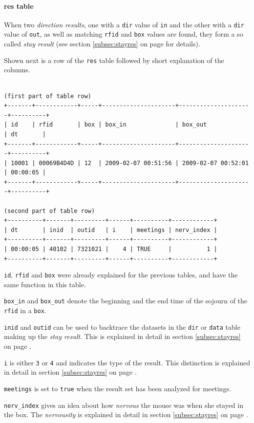 \paragraph{res table}
\label{para:res_table}

When two \textit{direction results}, one with a \lstinline|dir| value of \lstinline|in| and the other with a \lstinline|dir| value of \lstinline|out|, as well as matching \lstinline|rfid| and \lstinline|box| values are found, they form a so called \textit{stay result} (see section \ref{subsec:stayres} on page \pageref{subsec:stayres} for details).

Shown next is a row of the \lstinline|res| table followed by short explanation of the columns.

\codescript
\begin{lstlisting}[frame=none]

(first part of table row)
+-------+------------+-----+---------------------+---------------------+----------+
| id    | rfid       | box | box_in              | box_out             | dt       |
+-------+------------+-----+---------------------+---------------------+----------+
| 10001 | 00069B4D4D | 12  | 2009-02-07 00:51:56 | 2009-02-07 00:52:01 | 00:00:05 |
+-------+------------+-----+---------------------+---------------------+----------+

(second part of table row)
+----------+-------+---------+------+----------+------------+
| dt       | inid  | outid   | i    | meetings | nerv_index |
+----------+-------+---------+------+----------+------------+
| 00:00:05 | 40102 | 7321021 |    4 | TRUE     |          1 | 
+----------+-------+---------+------+----------+------------+

\end{lstlisting}

\begin{mydesc}
	\item \lstinline|id|, \lstinline|rfid| and \lstinline|box| were already explained for the previous tables, and have the same function in this table.
	\item \lstinline|box_in| and \lstinline|box_out| denote the beginning and the end time of the sojourn of the \lstinline|rfid| in a \lstinline|box|.
	 \item \lstinline|inid| and \lstinline|outid| can be used to backtrace the datasets in the \lstinline|dir| or \lstinline|data| table making up the \textit{stay result}. This is explained in detail in section \ref{subsec:stayres} on page \pageref{subsec:stayres}.
	 \item \lstinline|i| is either \lstinline|3| or \lstinline|4| and indicates the type of the result. This distinction is explained in detail in section \ref{subsec:stayres} on page \pageref{subsec:stayres}.
	 \item \lstinline|meetings| is set to \lstinline|true| when the result set has been analyzed for meetings.
	 \item \lstinline|nerv_index| gives an idea about how \textit{nervous} the mouse was when she stayed in the box. The \textit{nervousity} is explained in detail in section \ref{subsec:stayres} on page \pageref{subsec:stayres}. 
\end{mydesc}

